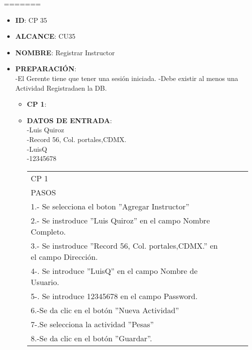=======

% 


\begin{itemize}
\item \textbf{ID}: CP 35
\item \textbf{ALCANCE}: CU35
\item \textbf{NOMBRE}: Registrar Instructor
\item \textbf{PREPARACIÓN}:\\
		-El Gerente tiene que tener una sesión iniciada.
		-Debe existir al menos una Actividad Registradaen la DB.
\begin{itemize}
\item \textbf{CP 1}:
\item \textbf{DATOS DE ENTRADA}:\\
-Luis Quiroz\\
-Record 56, Col. portales,CDMX.\\
-LuisQ\\
-12345678\\
	\begin{center}			
	\begin{tabular}{||l|l|l|l||}
		\hline
		\hline
			CP 1\\
			PASOS\\
			\hline 1.- Se selecciona el boton ''Agregar Instructor''\\
			\hline 2.- Se instroduce ''Luis Quiroz'' en el campo  Nombre Completo.\\
			\hline 3.- Se instroduce ''Record 56, Col. portales,CDMX.'' en el campo  Dirección.\\
			\hline 4-. Se introduce  ''LuisQ'' en el campo Nombre de Usuario.\\
			\hline 5-. Se introduce  12345678  en el campo Password.\\
            \hline 6.-Se da clic en el botón ''Nueva Actividad''\\
            \hline 7-.Se selecciona la actividad ''Pesas''\\
            \hline 8.-Se da clic en el botón ''Guardar''.\\
        \hline
		\hline
	\end{tabular}
	\end{center}

\end{itemize}
\end{itemize}
